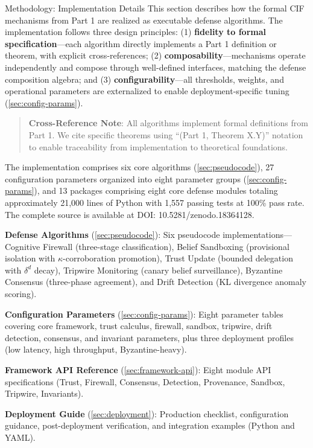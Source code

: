\documentclass[
  ignorenonframetext,
]{beamer}
\author{\texorpdfstring{}{}}
\date{}
\begin{document}
\begin{frame}
\newpage
\end{frame}

\begin{frame}{Methodology: Implementation Details}
\protect{}\label{sec:methodology}
This section describes how the formal CIF mechanisms from Part 1 are
realized as executable defense algorithms. The implementation follows
three design principles: (1) \textbf{fidelity to formal
specification}---each algorithm directly implements a Part 1 definition
or theorem, with explicit cross-references; (2)
\textbf{composability}---mechanisms operate independently and compose
through well-defined interfaces, matching the defense composition
algebra; and (3) \textbf{configurability}---all thresholds, weights, and
operational parameters are externalized to enable deployment-specific
tuning (\cref{sec:config-params}).

\begin{quote}
\textbf{Cross-Reference Note}: All algorithms implement formal
definitions from Part 1. We cite specific theorems using ``(Part 1,
Theorem X.Y)'' notation to enable traceability from implementation to
theoretical foundations.
\end{quote}

The implementation comprises six core algorithms
(\cref{sec:pseudocode}), 27 configuration parameters organized into
eight parameter groups (\cref{sec:config-params}), and 13 packages
comprising eight core defense modules totaling approximately 21,000
lines of Python with 1,557 passing tests at 100\% pass rate. The
complete source is available at DOI: 10.5281/zenodo.18364128.

\textbf{Defense Algorithms} (\cref{sec:pseudocode}): Six pseudocode
implementations---Cognitive Firewall (three-stage classification),
Belief Sandboxing (provisional isolation with \(\kappa\)-corroboration
promotion), Trust Update (bounded delegation with \(\delta^d\) decay),
Tripwire Monitoring (canary belief surveillance), Byzantine Consensus
(three-phase agreement), and Drift Detection (KL divergence anomaly
scoring).

\textbf{Configuration Parameters} (\cref{sec:config-params}): Eight
parameter tables covering core framework, trust calculus, firewall,
sandbox, tripwire, drift detection, consensus, and invariant parameters,
plus three deployment profiles (low latency, high throughput,
Byzantine-heavy).

\textbf{Framework API Reference} (\cref{sec:framework-api}): Eight
module API specifications (Trust, Firewall, Consensus, Detection,
Provenance, Sandbox, Tripwire, Invariants).

\textbf{Deployment Guide} (\cref{sec:deployment}): Production checklist,
configuration guidance, post-deployment verification, and integration
examples (Python and YAML).
\end{frame}
\end{document}
